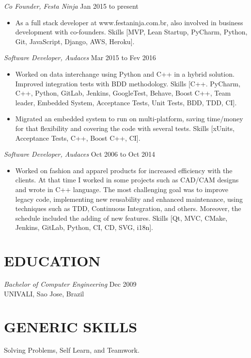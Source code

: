 \documentclass[line,margin]{res}
\begin{document}
\begin{resume}
                {\sl Co Founder, Festa Ninja} \hfill Jan 2015 to present \\
                 \begin{itemize}  \itemsep -2pt
                 \item As a full stack developer at www.festaninja.com.br, also involved in business development with co-founders. Skills [MVP, Lean Startup, PyCharm, Python, Git, JavaScript, Django, AWS, Heroku].
                 \end{itemize}

                {\sl Software Developer, Audaces} \hfill Mar 2015 to Fev 2016 \\
                  \begin{itemize}
                    \item Worked on data interchange using Python and C++ in a hybrid solution. Improved integration tests with BDD methodology. Skills [C++. PyCharm, C++, Python, GitLab, Jenkins, GoogleTest, Behave, Boost C++, Team leader, Embedded System, Acceptance Tests, Unit Tests, BDD, TDD, CI].
                    \item Migrated an embedded system to run on multi-platform, saving time/money for that flexibility and covering the code with several tests. Skills [xUnits, Acceptance Tests, C++, Boost C++, CI].
                   \end{itemize}

                {\sl Software Developer, Audaces} \hfill Oct 2006 to Oct 2014 \\
                  \begin{itemize}
                   \item Worked on fashion and apparel products for increased efficiency with the clients. At that time I worked in some projects such as CAD/CAM designs and wrote in C++ language. The most challenging goal was to improve legacy code, implementing new reusability and enhanced maintenance, using techniques such as TDD, Continuous Integration, and others. Moreover, the schedule included the adding of new features. Skills [Qt, MVC, CMake, Jenkins, GitLab, Python, CI, CD, SVG, i18n].
                   \end{itemize}
\section{EDUCATION} {\sl Bachelor of Computer Engineering} \hfill Dec 2009\\
                UNIVALI, Sao Jose, Brazil
\section{GENERIC SKILLS} Solving Problems, Self Learn, and Teamwork.
\end{resume}
\end{document}
